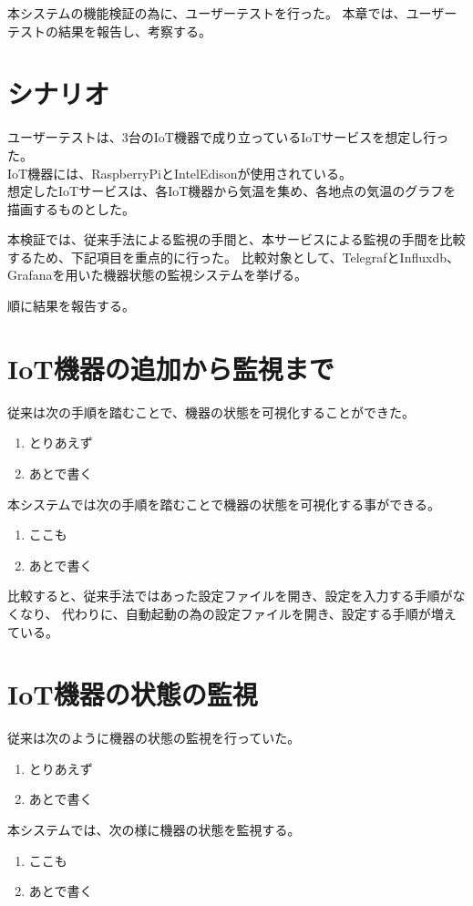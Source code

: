本システムの機能検証の為に、ユーザーテストを行った。
本章では、ユーザーテストの結果を報告し、考察する。

\section{シナリオ}
ユーザーテストは、3台のIoT機器で成り立っているIoTサービスを想定し行った。\\
IoT機器には、RaspberryPiとIntelEdisonが使用されている。\\
想定したIoTサービスは、各IoT機器から気温を集め、各地点の気温のグラフを描画するものとした。

本検証では、従来手法による監視の手間と、本サービスによる監視の手間を比較するため、下記項目を重点的に行った。
比較対象として、TelegrafとInfluxdb、Grafanaを用いた機器状態の監視システムを挙げる。

順に結果を報告する。
\section{IoT機器の追加から監視まで}
従来は次の手順を踏むことで、機器の状態を可視化することができた。
\begin{enumerate}
\item とりあえず
\item あとで書く
\end{enumerate}

本システムでは次の手順を踏むことで機器の状態を可視化する事ができる。
\begin{enumerate}
\item ここも
\item あとで書く
\end{enumerate}

比較すると、従来手法ではあった設定ファイルを開き、設定を入力する手順がなくなり、
代わりに、自動起動の為の設定ファイルを開き、設定する手順が増えている。

\section{IoT機器の状態の監視}
従来は次のように機器の状態の監視を行っていた。
\begin{enumerate}
\item とりあえず
\item あとで書く
\end{enumerate}

本システムでは、次の様に機器の状態を監視する。
\begin{enumerate}
\item ここも
\item あとで書く
\end{enumerate}

